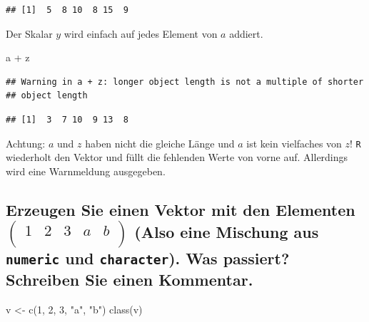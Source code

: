 \documentclass[12pt,a4paper]{article}
\newenvironment{Shaded}{\begin{snugshade}}{\end{snugshade}}
\newcommand{\DecValTok}[1]{\textcolor[rgb]{0.00,0.00,0.81}{#1}}
\newcommand{\FunctionTok}[1]{\textcolor[rgb]{0.00,0.00,0.00}{#1}}
\newcommand{\NormalTok}[1]{#1}
\newcommand{\OtherTok}[1]{\textcolor[rgb]{0.56,0.35,0.01}{#1}}
\newcommand{\SpecialCharTok}[1]{\textcolor[rgb]{0.00,0.00,0.00}{#1}}
\newcommand{\StringTok}[1]{\textcolor[rgb]{0.31,0.60,0.02}{#1}}
\begin{document}
\begin{verbatim}
## [1]  5  8 10  8 15  9
\end{verbatim}

Der Skalar \(y\) wird einfach auf jedes Element von \(a\) addiert.

\begin{Shaded}
\begin{Highlighting}[]
\NormalTok{    a }\SpecialCharTok{+}\NormalTok{ z}
\end{Highlighting}
\end{Shaded}

\begin{verbatim}
## Warning in a + z: longer object length is not a multiple of shorter
## object length
\end{verbatim}

\begin{verbatim}
## [1]  3  7 10  9 13  8
\end{verbatim}

Achtung: \(a\) und \(z\) haben nicht die gleiche Länge und \(a\) ist
kein vielfaches von \(z\)! \texttt{R} wiederholt den Vektor und füllt
die fehlenden Werte von vorne auf. Allerdings wird eine Warnmeldung
ausgegeben.

\vspace{0.5cm}

\hypertarget{erzeugen-sie-einen-vektor-mit-den-elementen-beginpmatrix-1-2-3-a-b-endpmatrix-also-eine-mischung-aus-numeric-und-character.-was-passiert-schreiben-sie-einen-kommentar.}{%
\subsection{\texorpdfstring{Erzeugen Sie einen Vektor mit den Elementen
\(\begin{pmatrix} 1 & 2 & 3 & a & b \\ \end{pmatrix}\) (Also eine
Mischung aus \texttt{numeric} und \texttt{character}). Was passiert?
Schreiben Sie einen
Kommentar.}{Erzeugen Sie einen Vektor mit den Elementen \textbackslash begin\{pmatrix\} 1 \& 2 \& 3 \& a \& b \textbackslash\textbackslash{} \textbackslash end\{pmatrix\} (Also eine Mischung aus numeric und character). Was passiert? Schreiben Sie einen Kommentar.}}\label{erzeugen-sie-einen-vektor-mit-den-elementen-beginpmatrix-1-2-3-a-b-endpmatrix-also-eine-mischung-aus-numeric-und-character.-was-passiert-schreiben-sie-einen-kommentar.}}

\begin{Shaded}
\begin{Highlighting}[]
\NormalTok{    v }\OtherTok{\textless{}{-}} \FunctionTok{c}\NormalTok{(}\DecValTok{1}\NormalTok{, }\DecValTok{2}\NormalTok{, }\DecValTok{3}\NormalTok{, }\StringTok{"a"}\NormalTok{, }\StringTok{"b"}\NormalTok{)}
    \FunctionTok{class}\NormalTok{(v)}
\end{Highlighting}
\end{Shaded}
\end{document}
